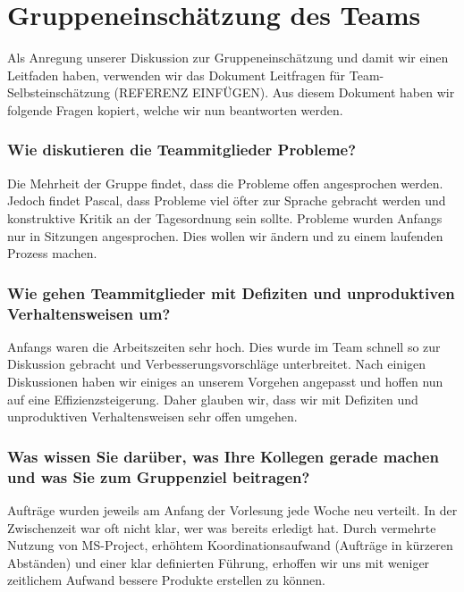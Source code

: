 \chapter{Gruppeneinschätzung des Teams}\label{Gruppenteameinschätzung}

Als Anregung unserer Diskussion zur Gruppeneinschätzung und damit wir einen Leitfaden haben, verwenden wir das Dokument Leitfragen für Team-Selbsteinschätzung (REFERENZ EINFÜGEN). Aus diesem Dokument haben wir folgende Fragen kopiert, welche wir nun beantworten werden.
  
\subsection*{Wie diskutieren die Teammitglieder Probleme?}

Die Mehrheit der Gruppe findet, dass die Probleme offen angesprochen werden. Jedoch findet Pascal, dass Probleme viel öfter zur Sprache gebracht werden und konstruktive Kritik an der Tagesordnung sein sollte. 
Probleme wurden Anfangs nur in Sitzungen angesprochen. Dies wollen wir ändern und zu einem laufenden Prozess machen. 

\subsection*{Wie gehen Teammitglieder mit Defiziten und unproduktiven Verhaltensweisen um?}

Anfangs waren die Arbeitszeiten sehr hoch. Dies wurde im Team schnell so zur Diskussion gebracht und Verbesserungsvorschläge unterbreitet. Nach einigen Diskussionen haben wir einiges an unserem Vorgehen angepasst und hoffen nun auf eine Effizienzsteigerung. Daher glauben wir, dass wir mit Defiziten und unproduktiven Verhaltensweisen sehr offen umgehen.

\subsection*{Was wissen Sie darüber, was Ihre Kollegen gerade machen und was Sie zum
Gruppenziel beitragen?}

Aufträge wurden jeweils am Anfang der Vorlesung jede Woche neu verteilt. In der Zwischenzeit war oft nicht klar, wer was bereits erledigt hat. Durch vermehrte Nutzung von MS-Project, erhöhtem Koordinationsaufwand (Aufträge in kürzeren Abständen) und einer klar definierten Führung, erhoffen wir uns mit weniger zeitlichem Aufwand bessere Produkte erstellen zu können.


